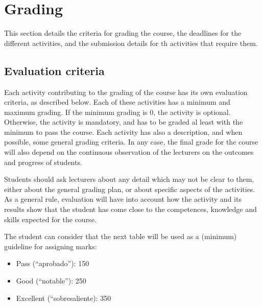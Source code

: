 \documentclass[a4paper]{article}
\begin{document}
\section{Grading}

This section details the criteria for grading the course, the deadlines for the different activities, and the submission details for th activities that require them.

\subsection{Evaluation criteria}
\label{sub:evaluation-criteria}

Each activity contributing to the grading of the course has its own evaluation criteria, as described below. Each of these activities has a minimum and maximum grading. If the minimum grading is 0, the activity is optional. Otherwise, the activity is mandatory, and has to be graded al least with the minimum to pass the course. Each activity has also a description, and when possible, some general grading criteria. In any case, the final grade for the course will also depend on the continuous observation of the lecturers on the outcomes and progress of students.

Students should ask lecturers about any detail which may not be clear to them, either about the general grading plan, or about specific aspects of the activities. As a general rule, evaluation will have into account how the activity and its results show that the student has come close to the competences, knowledge and skills expected for the course.

The student can consider that the next table will be used as a (minimum) guideline for assigning marks:

\begin{itemize}
\item Pass (``aprobado''): 150
\item Good (``notable''): 250
\item Excellent (``sobresaliente): 350
\end{itemize}
\end{document}
